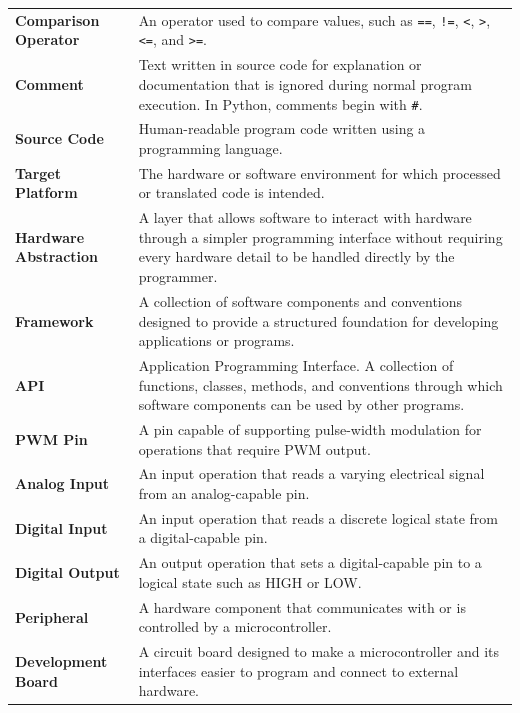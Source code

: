 \documentclass[11pt]{book}
\begin{document}
\begin{longtable}{p{} p{}}
    \textbf{Comparison Operator} &
    An operator used to compare values, such as \texttt{==}, \texttt{!=}, \texttt{<}, \texttt{>}, \texttt{<=}, and \texttt{>=}. \\

    \textbf{Comment} &
    Text written in source code for explanation or documentation that is ignored during normal program execution. In Python, comments begin with \texttt{\#}. \\

    \textbf{Source Code} &
    Human-readable program code written using a programming language. \\

    \textbf{Target Platform} &
    The hardware or software environment for which processed or translated code is intended. \\

    \textbf{Hardware Abstraction} &
    A layer that allows software to interact with hardware through a simpler programming interface without requiring every hardware detail to be handled directly by the programmer. \\

    \textbf{Framework} &
    A collection of software components and conventions designed to provide a structured foundation for developing applications or programs. \\

    \textbf{API} &
    Application Programming Interface. A collection of functions, classes, methods, and conventions through which software components can be used by other programs. \\

    \textbf{PWM Pin} &
    A pin capable of supporting pulse-width modulation for operations that require PWM output. \\

    \textbf{Analog Input} &
    An input operation that reads a varying electrical signal from an analog-capable pin. \\

    \textbf{Digital Input} &
    An input operation that reads a discrete logical state from a digital-capable pin. \\

    \textbf{Digital Output} &
    An output operation that sets a digital-capable pin to a logical state such as HIGH or LOW. \\

    \textbf{Peripheral} &
    A hardware component that communicates with or is controlled by a microcontroller. \\

    \textbf{Development Board} &
    A circuit board designed to make a microcontroller and its interfaces easier to program and connect to external hardware. \\

\end{longtable}
	\backmatter
\end{document}
